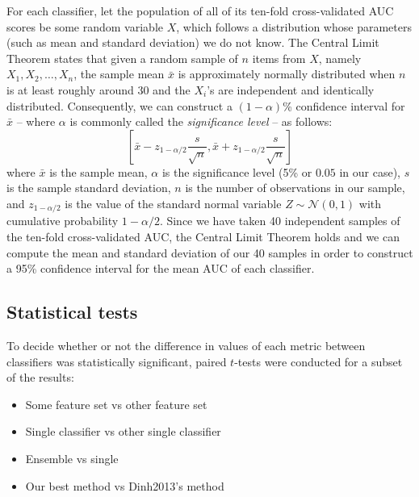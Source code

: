 For each classifier, let the population of all of its ten-fold cross-validated
AUC scores be some random variable $X$, which follows a distribution whose
parameters (such as mean and standard deviation) we do not know.
The Central Limit Theorem states that given a random
sample of $n$ items from $X$, namely $X_1,X_2,\dots,X_n$, the sample mean
$\bar{x}$
is approximately normally distributed when $n$ is at least roughly around 30
and the $X_i$'s are independent and identically distributed.
Consequently, we can construct a $(1-\alpha)$\% confidence interval for
$\bar{x}$ -- where $\alpha$ is commonly called the
\textit{significance level} -- as follows:
\begin{equation}
  \left[\bar{x} - z_{1-\alpha/2}\dfrac{s}{\sqrt{n}},
    \bar{x} + z_{1-\alpha/2}\dfrac{s}{\sqrt{n}}\right]
\end{equation}
where $\bar{x}$ is the sample mean, $\alpha$ is the significance level
(5\% or $0.05$ in our case), $s$ is the sample standard deviation, $n$
is the number of observations in our sample, and $z_{1-\alpha/2}$ is the value
of the standard normal variable $Z \sim \mathcal{N}(0,1)$ with cumulative
probability $1-\alpha/2$. Since we have taken 40 independent samples of the
ten-fold cross-validated AUC, the Central Limit Theorem holds and we can
compute the mean and standard deviation of our 40 samples in order to
construct a 95\% confidence interval for the mean AUC of each classifier.

\subsection{Statistical tests}
To decide whether or not the difference in values of each metric between
classifiers was statistically significant, paired $t$-tests were conducted for
a subset of the results: 
\begin{itemize}
  \item Some feature set vs other feature set
  \item Single classifier vs other single classifier
  \item Ensemble vs single
  \item Our best method vs Dinh2013's method
\end{itemize}
